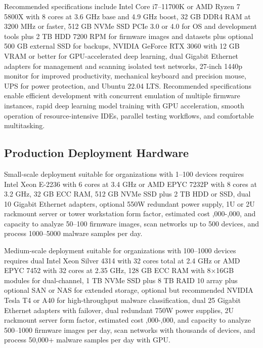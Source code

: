 Recommended specifications include Intel Core i7--11700K or AMD Ryzen 7 5800X with 8 cores at 3.6 GHz base and 4.9 GHz boost, 32 GB DDR4 RAM at 3200 MHz or faster, 512 GB NVMe SSD PCIe 3.0 or 4.0 for OS and development tools plus 2 TB HDD 7200 RPM for firmware images and datasets plus optional 500 GB external SSD for backups, NVIDIA GeForce RTX 3060 with 12 GB VRAM or better for GPU-accelerated deep learning, dual Gigabit Ethernet adapters for management and scanning isolated test networks, 27-inch 1440p monitor for improved productivity, mechanical keyboard and precision mouse, UPS for power protection, and Ubuntu 22.04 LTS. Recommended specifications enable efficient development with concurrent emulation of multiple firmware instances, rapid deep learning model training with GPU acceleration, smooth operation of resource-intensive IDEs, parallel testing workflows, and comfortable multitasking.

\subsection{Production Deployment Hardware}

Small-scale deployment suitable for organizations with 1--100 devices requires Intel Xeon E-2236 with 6 cores at 3.4 GHz or AMD EPYC 7232P with 8 cores at 3.2 GHz, 32 GB ECC RAM, 512 GB NVMe SSD plus 2 TB HDD or SSD, dual 10 Gigabit Ethernet adapters, optional 550W redundant power supply, 1U or 2U rackmount server or tower workstation form factor, estimated cost ,000-,000, and capacity to analyze 50--100 firmware images, scan networks up to 500 devices, and process 1000--5000 malware samples per day.

Medium-scale deployment suitable for organizations with 100--1000 devices requires dual Intel Xeon Silver 4314 with 32 cores total at 2.4 GHz or AMD EPYC 7452 with 32 cores at 2.35 GHz, 128 GB ECC RAM with 8$\times$16GB modules for dual-channel, 1 TB NVMe SSD plus 8 TB RAID 10 array plus optional SAN or NAS for extended storage, optional but recommended NVIDIA Tesla T4 or A40 for high-throughput malware classification, dual 25 Gigabit Ethernet adapters with failover, dual redundant 750W power supplies, 2U rackmount server form factor, estimated cost ,000-,000, and capacity to analyze 500--1000 firmware images per day, scan networks with thousands of devices, and process 50,000+ malware samples per day with GPU.

